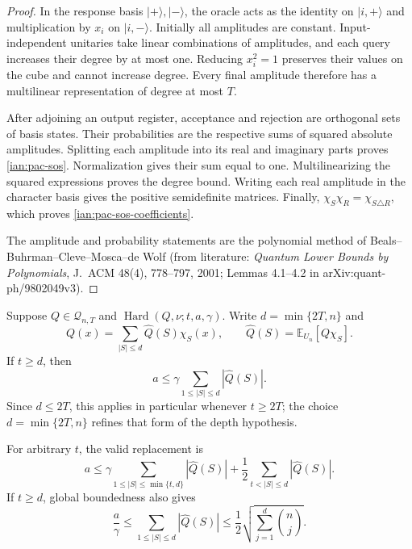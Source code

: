 \begin{proof}
In the response basis
\(|+\rangle,|-\rangle\), the oracle acts as the identity on
\(|i,+\rangle\) and multiplication by \(x_i\) on
\(|i,-\rangle\). Initially all amplitudes are constant.
Input-independent unitaries take linear combinations of amplitudes,
and each query increases their degree by at most one.
Reducing \(x_i^2=1\) preserves their values on the cube and cannot
increase degree. Every final amplitude therefore has a multilinear
representation of degree at most \(T\).

After adjoining an output register, acceptance and rejection are
orthogonal sets of basis states. Their probabilities are the
respective sums of squared absolute amplitudes. Splitting each
amplitude into its real and imaginary parts proves
\eqref{ian:pac-sos}. Normalization gives their sum equal to one.
Multilinearizing the squared expressions proves the degree bound.
Writing each real amplitude in the character basis gives the
positive semidefinite matrices. Finally,
\(\chi_S\chi_R=\chi_{S\triangle R}\), which proves
\eqref{ian:pac-sos-coefficients}.

The amplitude and probability statements are the polynomial method
of Beals--Buhrman--Cleve--Mosca--de Wolf (from literature:
\emph{Quantum Lower Bounds by Polynomials}, J.~ACM 48(4),
778--797, 2001; Lemmas 4.1--4.2 in arXiv:quant-ph/9802049v3).
\end{proof}

\begin{proposition}
\label{ian:pac-pm}
Suppose \(Q\in\mathcal Q_{n,T}\) and
\(\operatorname{Hard}(Q,\nu;t,a,\gamma)\).
Write \(d=\min\{2T,n\}\) and
\[
 Q(x)=\sum_{|S|\le d}\widehat Q(S)\chi_S(x),
 \qquad
 \widehat Q(S)=\mathbb E_{U_n}[Q\chi_S].
\]
If \(t\ge d\), then
\[
 a\le
 \gamma\sum_{1\le |S|\le d}|\widehat Q(S)|.
 \tag{32.3}\label{ian:pac-pm-display}
\]
Since \(d\le2T\), this applies in particular whenever \(t\ge2T\); the choice \(d=\min\{2T,n\}\) refines that form of the depth hypothesis.

For arbitrary \(t\), the valid replacement is
\[
 a\le
 \gamma\sum_{1\le |S|\le\min\{t,d\}}|\widehat Q(S)|
 +\frac12\sum_{t<|S|\le d}|\widehat Q(S)|.
 \tag{32.4}\label{ian:pac-pm-tail}
\]
If \(t\ge d\), global boundedness also gives
\[
 \frac a\gamma
 \le\sum_{1\le|S|\le d}|\widehat Q(S)|
 \le\frac12
       \sqrt{\sum_{j=1}^d\binom nj}.
\]
\end{proposition}

